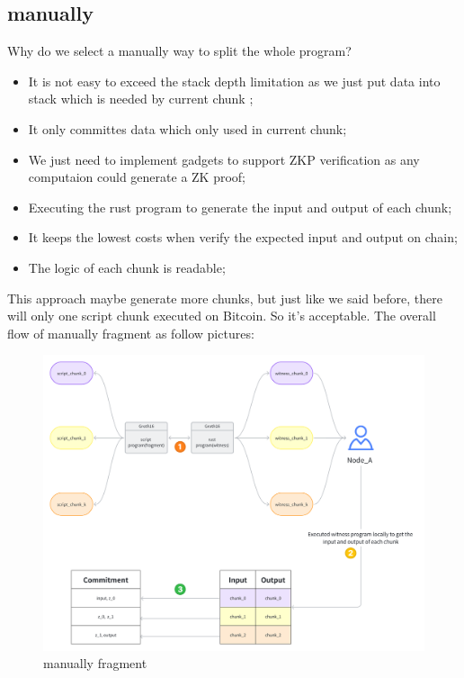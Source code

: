 \subsection{manually}

Why do we select a manually way to split the whole program?

\begin{itemize}
    \item It is not easy to exceed the stack depth limitation as we just put data into stack which is needed by current chunk ;
    \item It only committes data which only used in current chunk;
    \item We just need to implement gadgets to support ZKP verification as any computaion could generate a ZK proof;
    \item Executing the rust program to generate the input and output of each chunk;
    \item It keeps the lowest costs when verify the expected input and output on chain;
    \item The logic of each chunk is readable;
\end{itemize}

This approach maybe generate more chunks, but just like we said before, there will only one script chunk executed on Bitcoin. So it's acceptable.
The overall flow of manually fragment as follow pictures:
\begin{figure}[ht] 
    \centering  
    \includegraphics[width=0.85\columnwidth]{images/manually-fragment.png} 
    \caption{manually fragment}
    \label{fig:manually-fragment}
\end{figure}

